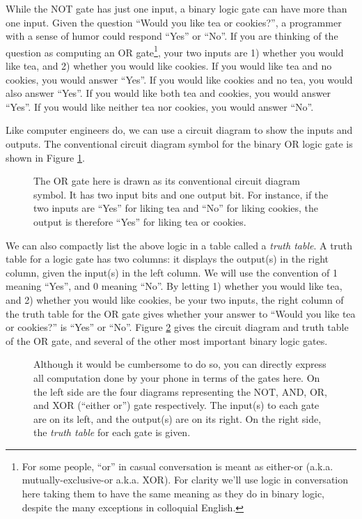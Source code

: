 \documentclass{article}
\theoremstyle{definition}
\begin{document}
While the NOT gate has just one input, a binary logic gate can have more than one input.  Given the question ``Would you like tea or cookies?'', a programmer with a sense of humor could respond ``Yes'' or ``No''.  If you are thinking of the question as computing an OR gate\footnote{For some people, ``or'' in casual conversation is meant as either-or (a.k.a. mutually-exclusive-or a.k.a. XOR).  For clarity we'll use logic in conversation here taking them to have the same meaning as they do in binary logic, despite the many exceptions in colloquial English.}, your two inputs are 1) whether you would like tea, and 2) whether you would like cookies.  If you would like tea and no cookies, you would answer ``Yes''.  If you would like cookies and no tea, you would also answer ``Yes''.  If you would like both tea and cookies, you would answer ``Yes''.  If you would like neither tea nor cookies, you would answer ``No''.

Like computer engineers do, we can use a circuit diagram to show the inputs and outputs.  The conventional circuit diagram symbol for the binary OR logic gate is shown in Figure \ref{ref:teaorcookies}.

\begin{figure}[H]
	\caption{The OR gate here is drawn as its conventional circuit diagram symbol.  It has two input bits and one output bit.  For instance, if the two inputs are ``Yes'' for liking tea and ``No'' for liking cookies, the output is therefore ``Yes'' for liking tea or cookies.}
	\label{ref:teaorcookies}
\end{figure}

We can also compactly list the above logic in a table called a \textit{truth table}.  A truth table for a logic gate has two columns: it displays the output(s) in the right column, given the input(s) in the left column.  We will use the convention of 1 meaning ``Yes'', and 0 meaning ``No''.  By letting 1) whether you would like tea, and 2) whether you would like cookies, be your two inputs, the right column of the truth table for the OR gate gives whether your answer to ``Would you like tea or cookies?'' is ``Yes'' or ``No''.  Figure \ref{fig:classical_logic_gates} gives the circuit diagram and truth table of the OR gate, and several of the other most important binary logic gates.
\begin{figure}[H]
	\caption{Although it would be cumbersome to do so, you can directly express all computation done by your phone in terms of the gates here.  On the left side are the four diagrams representing the NOT, AND, OR, and XOR (``either or'') gate respectively.  The input(s) to each gate are on its left, and the output(s) are on its right.  On the right side, the \textit{truth table} for each gate is given.}
	\label{fig:classical_logic_gates}
\end{figure}
\end{document}
